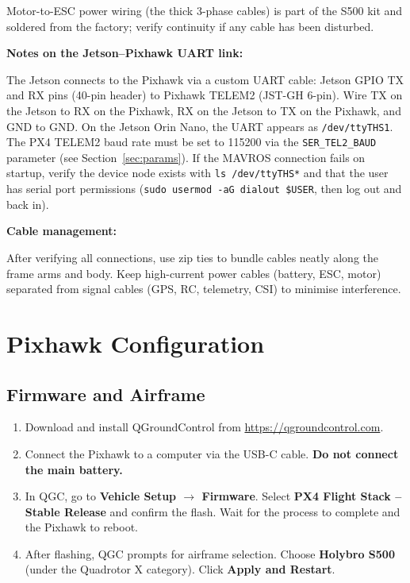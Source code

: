 \documentclass{article}
\begin{document}
Motor-to-ESC power wiring (the thick 3-phase cables) is part of the S500 kit and soldered from the factory; verify continuity if any cable has been disturbed.

\textbf{Notes on the Jetson--Pixhawk UART link:}

The Jetson connects to the Pixhawk via a custom UART cable: Jetson GPIO TX and RX pins (40-pin header) to Pixhawk TELEM2 (JST-GH 6-pin). Wire TX on the Jetson to RX on the Pixhawk, RX on the Jetson to TX on the Pixhawk, and GND to GND. On the Jetson Orin Nano, the UART appears as \texttt{/dev/ttyTHS1}. The PX4 TELEM2 baud rate must be set to 115200 via the \texttt{SER\_TEL2\_BAUD} parameter (see Section~\ref{sec:params}). If the MAVROS connection fails on startup, verify the device node exists with \texttt{ls /dev/ttyTHS*} and that the user has serial port permissions (\texttt{sudo usermod -aG dialout \$USER}, then log out and back in).

\textbf{Cable management:}

After verifying all connections, use zip ties to bundle cables neatly along the frame arms and body. Keep high-current power cables (battery, ESC, motor) separated from signal cables (GPS, RC, telemetry, CSI) to minimise interference.

\section{Pixhawk Configuration}

\subsection{Firmware and Airframe}

\begin{enumerate}
    \item Download and install QGroundControl from \url{https://qgroundcontrol.com}.
    \item Connect the Pixhawk to a computer via the USB-C cable. \textbf{Do not connect the main battery.}
    \item In QGC, go to \textbf{Vehicle Setup $\rightarrow$ Firmware}. Select \textbf{PX4 Flight Stack -- Stable Release} and confirm the flash. Wait for the process to complete and the Pixhawk to reboot.
    \item After flashing, QGC prompts for airframe selection. Choose \textbf{Holybro S500} (under the Quadrotor X category). Click \textbf{Apply and Restart}.
\end{enumerate}
\end{document}
